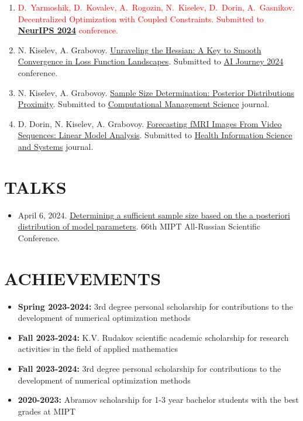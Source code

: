 \documentclass[11pt,a4paper]{moderncv}
\begin{document}
\begin{minipage}[t]{0.62\textwidth}
\begin{enumerate}
    \item \textcolor{red}{D.~Yarmoshik, D.~Kovalev, A.~Rogozin, N.~Kiselev, D.~Dorin, A.~Gasnikov. Decentralized Optimization with Coupled Constraints. Submitted to \href{https://neurips.cc}{\textbf{NeurIPS 2024}} conference.}
    \item N. Kiselev, A. Grabovoy. \href{https://github.com/kisnikser/landscape-hessian}{Unraveling the Hessian: A Key to Smooth Convergence in Loss Function Landscapes}. Submitted to \href{https://aij.ru/eng}{AI Journey 2024} conference.
    \item N. Kiselev, A. Grabovoy. \href{https://github.com/kisnikser/Posterior-Distributions-Proximity}{Sample Size Determination: Posterior Distributions Proximity}. Submitted to \href{https://link.springer.com/journal/10287}{Computational Management Science} journal.
    \item D. Dorin, N. Kiselev, A. Grabovoy. \href{https://github.com/DorinDaniil/Forecasting-fMRI-Images}{Forecasting fMRI Images From Video Sequences: Linear Model Analysis}. Submitted to \href{https://link.springer.com/journal/13755}{Health Information Science and Systems} journal.
\end{enumerate}

\section{TALKS}

\begin{itemize}
\item April 6, 2024. \href{https://www.youtube.com/live/WnIRaRl730A?si=q0eScgnDP2ZidCpK&t=1723}{Determining a sufficient sample size based on the a posteriori distribution of model parameters}. 66th MIPT All-Russian Scientific Conference.
\end{itemize}

\section{ACHIEVEMENTS}

\begin{itemize}
\item \textbf{Spring 2023-2024:} 3rd degree personal scholarship for contributions to the development of numerical optimization methods
\item \textbf{Fall 2023-2024:} K.V. Rudakov scientific academic scholarship for research activities in the field of applied mathematics
\item \textbf{Fall 2023-2024:} 3rd degree personal scholarship for contributions to the development of numerical optimization methods
\item \textbf{2020-2023:} Abramov scholarship for 1-3 year bachelor students with the best grades at MIPT
\end{itemize}


\end{minipage}
\end{document}
